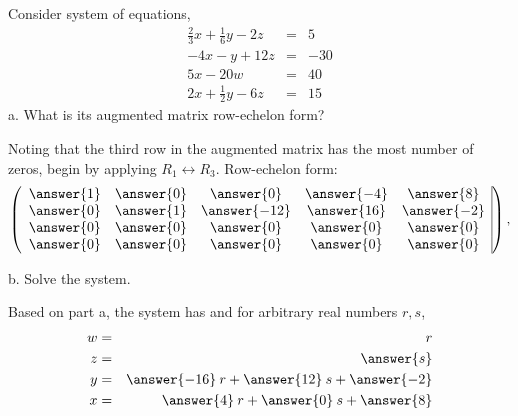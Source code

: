 \documentclass{ximera}
\author{Parisa Fatheddin}
\begin{document}
\begin{exercise} Consider system of equations,
\begin{eqnarray*}
\frac{2}{3}x + \frac{1}{6}y -2z &=& 5\\
-4x -y+12z &=& -30\\
5x-20w &=& 40\\
2x+\frac{1}{2} y - 6z &=& 15
\end{eqnarray*}
a. What is its augmented matrix row-echelon form? \\
\begin{prompt}
Noting that the third row in the augmented matrix has the most number of zeros, begin by applying $R_{1}\leftrightarrow R_{3}$. Row-echelon form:
\[
\left(\begin{array}{ccccc|c}
  \answer{1} &  \answer{0} & \answer{0} & \answer{-4} &\answer{8} \\
  \answer{0} &  \answer{1} & \answer{-12} & \answer{16} &\answer{-2}\\
  \answer{0} &  \answer{0} & \answer{0} & \answer{0} &\answer{0}\\
  \answer{0} &  \answer{0} & \answer{0} & \answer{0} &\answer{0}
\end{array}\right),
\]
\end{prompt}

b. Solve the system. \\
\begin{prompt}
Based on part a, the system has  and for arbitrary real numbers $r,s$,
\begin{eqnarray*}
w&=& r\\
z &=& \answer{s}\\
y &=& \answer{-16}\hspace{.08cm}r + \answer{12}\hspace{.08cm}s + \answer{-2}\\
x&=& \answer{4}\hspace{.08cm} r + \answer{0}\hspace{.08cm}s + \answer{8}
\end{eqnarray*}
\end{prompt}
\end{exercise}
\end{document}

